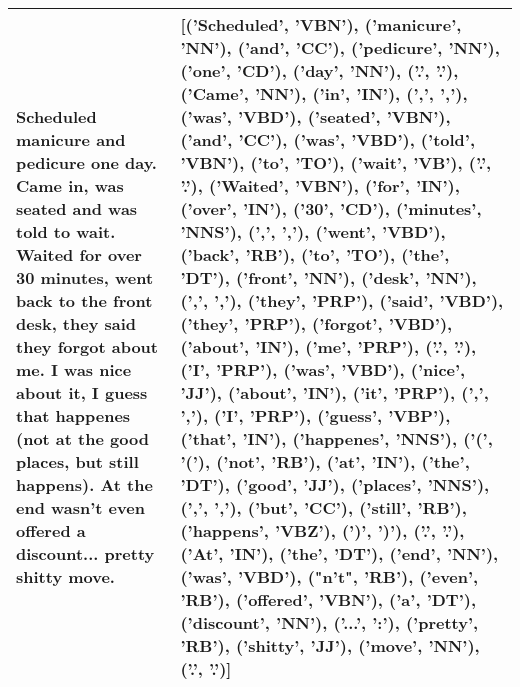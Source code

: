 \begin{longtable}{|| p{3cm} | p{3cm} ||}
         Scheduled manicure and pedicure one day. Came in, was seated and was told to wait. Waited for over 30 minutes, went back to the front desk, they said they forgot about me. I was nice about it, I guess that happenes (not at the good places, but still happens). At the end wasn't even offered a discount... pretty shitty move. & [('Scheduled', 'VBN'), ('manicure', 'NN'), ('and', 'CC'), ('pedicure', 'NN'), ('one', 'CD'), ('day', 'NN'), ('.', '.'), ('Came', 'NN'), ('in', 'IN'), (',', ','), ('was', 'VBD'), ('seated', 'VBN'), ('and', 'CC'), ('was', 'VBD'), ('told', 'VBN'), ('to', 'TO'), ('wait', 'VB'), ('.', '.'), ('Waited', 'VBN'), ('for', 'IN'), ('over', 'IN'), ('30', 'CD'), ('minutes', 'NNS'), (',', ','), ('went', 'VBD'), ('back', 'RB'), ('to', 'TO'), ('the', 'DT'), ('front', 'NN'), ('desk', 'NN'), (',', ','), ('they', 'PRP'), ('said', 'VBD'), ('they', 'PRP'), ('forgot', 'VBD'), ('about', 'IN'), ('me', 'PRP'), ('.', '.'), ('I', 'PRP'), ('was', 'VBD'), ('nice', 'JJ'), ('about', 'IN'), ('it', 'PRP'), (',', ','), ('I', 'PRP'), ('guess', 'VBP'), ('that', 'IN'), ('happenes', 'NNS'), ('(', '('), ('not', 'RB'), ('at', 'IN'), ('the', 'DT'), ('good', 'JJ'), ('places', 'NNS'), (',', ','), ('but', 'CC'), ('still', 'RB'), ('happens', 'VBZ'), (')', ')'), ('.', '.'), ('At', 'IN'), ('the', 'DT'), ('end', 'NN'), ('was', 'VBD'), ("n't", 'RB'), ('even', 'RB'), ('offered', 'VBN'), ('a', 'DT'), ('discount', 'NN'), ('...', ':'), ('pretty', 'RB'), ('shitty', 'JJ'), ('move', 'NN'), ('.', '.')] \\  
         \hline
    \end{longtable}

    


